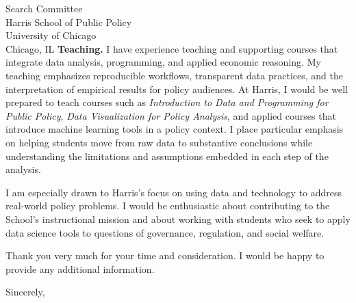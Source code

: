 \documentclass[11pt,letterpaper]{letter}
\begin{document}
\begin{letter}{Search Committee \\
Harris School of Public Policy \\
University of Chicago \\
Chicago, IL}
\textbf{Teaching.} I have experience teaching and supporting courses that integrate data analysis, programming, and applied economic reasoning. My teaching emphasizes reproducible workflows, transparent data practices, and the interpretation of empirical results for policy audiences. At Harris, I would be well prepared to teach courses such as \textit{Introduction to Data and Programming for Public Policy}, \textit{Data Visualization for Policy Analysis}, and applied courses that introduce machine learning tools in a policy context. I place particular emphasis on helping students move from raw data to substantive conclusions while understanding the limitations and assumptions embedded in each step of the analysis.

I am especially drawn to Harris’s focus on using data and technology to address real-world policy problems. I would be enthusiastic about contributing to the School’s instructional mission and about working with students who seek to apply data science tools to questions of governance, regulation, and social welfare.

Thank you very much for your time and consideration. I would be happy to provide any additional information.

\closing{Sincerely,}

\end{letter}
\end{document}
